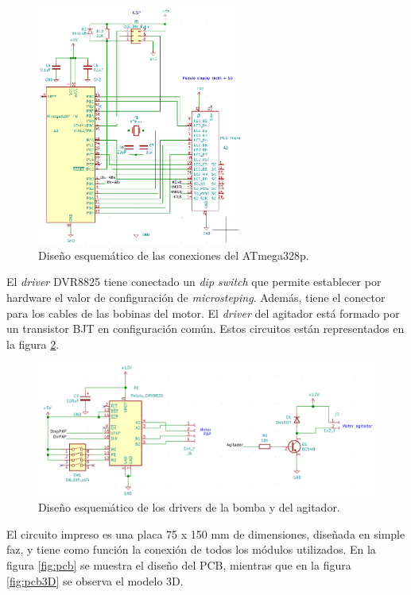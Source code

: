 \begin{figure}[htbp]
	\centering
	\includegraphics[width=0.6\textwidth]{./Figures/esquematicoAtmega.png}
	\caption{Diseño esquemático de las conexiones del ATmega328p.}
	\label{fig:esquematicoAtmega}
\end{figure}

El \textit{driver} DVR8825 tiene conectado un \textit{dip switch} que permite establecer por hardware el valor de configuración de \textit{microsteping}. Además, tiene el conector para los cables de las bobinas del motor. El \textit{driver} del agitador está formado por un transistor BJT en configuración común. Estos circuitos están representados en la figura \ref{fig:esquematicoMotores}.

\begin{figure}[htbp]
	\centering
	\includegraphics[width=1.0\textwidth]{./Figures/esquematicoMotores.png}
	\caption{Diseño esquemático de los drivers de la bomba y del agitador.}
	\label{fig:esquematicoMotores}
\end{figure}

El circuito impreso es una placa 75 x 150 mm de dimensiones, diseñada en simple faz, y tiene como función la conexión de todos los módulos utilizados. En la figura \ref{fig:pcb} se muestra el diseño del PCB, mientras que en la figura \ref{fig:pcb3D} se observa el modelo 3D.

